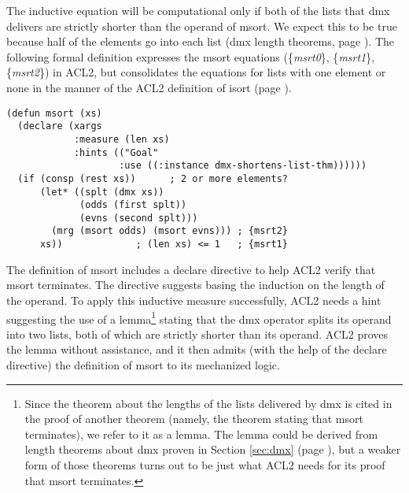 The inductive equation will be computational only if
both of the lists that \textsf{dmx} delivers are strictly
shorter than the operand of \textsf{msort}.
We expect this to be true because half
of the elements go into each list
(\textsf{dmx} length theorems, page \pageref{thm:dmx-length-first-second}).
The following formal definition expresses the \textsf{msort}
equations (\{\emph{msrt0}\}, \{\emph{msrt1}\}, \{\emph{msrt2}\}) in ACL2,
but consolidates the equations for lists with one element or none in the
manner of the ACL2 definition of \textsf{isort} (page \pageref{defun:isort}).

\label{defun:msort}\label{eq:msrt1}
\begin{Verbatim}
(defun msort (xs)
  (declare (xargs
            :measure (len xs)
            :hints (("Goal"
                    :use ((:instance dmx-shortens-list-thm))))))
  (if (consp (rest xs))      ; 2 or more elements?
      (let* ((splt (dmx xs))
             (odds (first splt))
             (evns (second splt)))
        (mrg (msort odds) (msort evns))) ; {msrt2}
      xs))             ; (len xs) <= 1   ; {msrt1}
\end{Verbatim}

The definition of \textsf{msort} includes
a \textsf{declare} directive
to help ACL2 verify that \textsf{msort} terminates.
The directive suggests basing the induction on the length of the operand.
To apply this inductive measure successfully,
ACL2 needs a hint suggesting the use of a lemma\footnote{Since
the theorem about the lengths of the lists
delivered by \textsf{dmx} is cited in the proof of another theorem
(namely, the theorem stating that \textsf{msort} terminates),
we refer to it as a lemma.
The lemma could be derived from length theorems about \textsf{dmx}
proven in Section \ref{sec:dmx} (page \pageref{thm:dmx-length-first-second}),
but a weaker form of those theorems turns out to be just what
ACL2 needs for its proof that \textsf{msort} terminates.}
stating that the \textsf{dmx} operator splits its
operand into two lists, both of which are strictly shorter than its operand.
ACL2 proves the lemma without assistance,
and it then admits (with the help of the \textsf{declare} directive)
the definition of \textsf{msort} to its mechanized logic.


